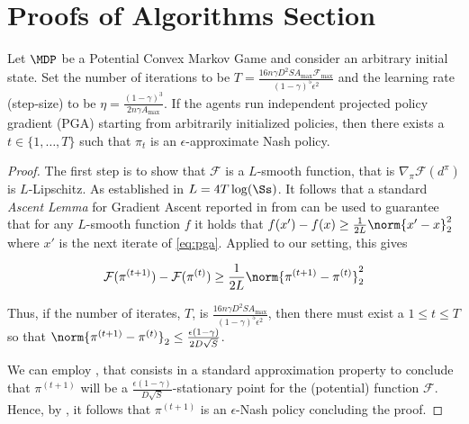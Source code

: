 \section{Proofs of Algorithms Section}
\label{apx:proof2}



\begin{theorem}\label{thm:mainformal} Let $\MDP$ be a Potential Convex Markov Game and consider an arbitrary initial state. Set the number of iterations to be $T=\frac{16n\gamma D^2 S A_{\max} \mathcal F_{\max}}{(1-\gamma)^5\epsilon^2}$ and the learning rate (step-size) to be $\eta = \frac{(1-\gamma)^3}{2n\gamma A_{\max}}$. If the agents run independent projected policy gradient (PGA) starting from arbitrarily initialized policies, then there exists a $t\in \{1,\dots,T\}$ such that $\pi_t$ is an $\epsilon$-approximate Nash policy.
\end{theorem}

\begin{proof}


The first step is to show that $\mathcal F$ is a $L$-smooth function, that is $\nabla_{\pi}\mathcal F(d^\pi)$ is $L$-Lipschitz. As established in  $L=4T\log(\Ss)$. It follows that a standard \emph{Ascent Lemma} for Gradient Ascent reported in  from \citet{bubeck} can be used to guarantee that for any $L$-smooth function $f$ it holds that $f(x') - f(x) \geq \frac{1}{2L} \norm{x'-x}^2_2$ where $x'$ is the next iterate of \eqref{eq:pga}. Applied to our setting, this gives

\begin{equation}\label{eq:ascent}
    \mathcal F(\pi^{(t+1)}) - \mathcal F(\pi^{(t)}) \geq \frac{1}{2L}\norm{\pi^{(t+1)}-\pi^{(t)}}_2^2
\end{equation}

Thus, if the number of iterates, $T$, is $\frac{16n\gamma D^2 S A_{\max}  }{(1-\gamma)^5\epsilon^2}$, then there must exist a $1 \leq t\leq T$ so that $\norm{\pi^{(t+1) }-\pi^{(t)}}_2 \leq \frac{\epsilon(1-\gamma)}{2D\sqrt{S}}$.

We can employ , that consists in a standard approximation property to conclude that $\pi^{(t+1)}$ will be a $\frac{\epsilon(1-\gamma)}{D\sqrt{S}}$-stationary point for the (potential) function $\mathcal F$. Hence, by , it follows that $\pi^{(t+1)}$ is an $\epsilon$-Nash policy concluding the proof.
\end{proof}


